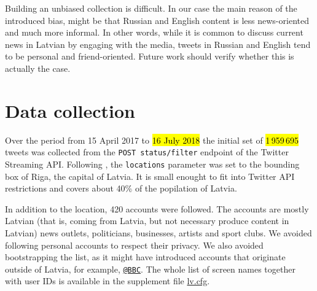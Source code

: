 \documentclass{IOS-Book-Article}
\makeatletter
\newcommand{\sn}[1]{\href{https://twitter.com/#1}{\texttt{@#1}}}
\newcommand{\zenodoBase}{https://zenodo.org/record/1313732}
\newcommand{\sfile}[1]{\href{\zenodoBase/files/#1}{#1}}
\makeatother
\begin{document}

Building an unbiased collection is difficult.  In our case the main reason of the introduced bias, might be that Russian and English content is less news-oriented and much more informal. In other words, while it is common to discuss current news in Latvian by engaging with the media, tweets in Russian and English tend to be personal and friend-oriented. Future work should verify whether this is actually the case.

\section{Data collection}
\label{sec:data-collection}



Over the period from 15 April 2017 to \hl{16 July 2018} the initial set of \hl{1\,959\,695} tweets was collected from the \texttt{POST status/filter} endpoint of the Twitter Streaming API. Following \cite{milajevs:2017:BUCC}, the \texttt{locations} parameter was set to the bounding box of Riga, the capital of Latvia. It is small enought to fit into Twitter API restrictions and covers about 40\% of the popilation of Latvia.\footnotemark{}
%

In addition to the location, 420 accounts were followed.\footnotemark{} The accounts are mostly Latvian (that is, coming from Latvia, but not necessary produce content in Latvian) news outlets, politicians, businesses, artists and sport clubs. We avoided following personal accounts to respect their privacy. We also avoided bootstrapping the list, as it might have introduced accounts that originate outside of Latvia, for example, \sn{BBC}. The whole list of screen names together with user IDs is available in the supplement file \sfile{lv.cfg}.

\end{document}
